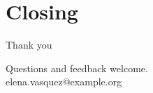 \documentclass{beamer}
\begin{document}
\section{Closing}

\begin{frame}{Thank you}
  \begin{card}
    Questions and feedback welcome.\\[2mm]
    elena.vasquez@example.org
  \end{card}
\end{frame}
\end{document}
